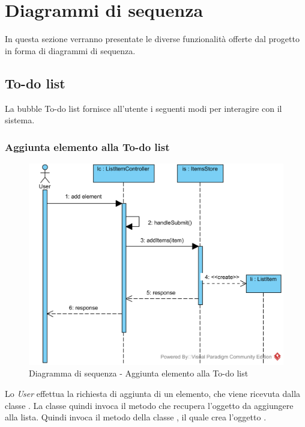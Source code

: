 \section{Diagrammi di sequenza}
In questa sezione verranno presentate le diverse funzionalità offerte dal progetto in forma di diagrammi di sequenza.

\subsection{To-do list}
La bubble To-do list fornisce all'utente i seguenti modi per interagire con il sistema.

\subsubsection{Aggiunta elemento alla To-do list}
\begin{figure}[H]
	\centering
	\includegraphics[width=15cm]{./diagrammi/sequenza/aggiunta_elemento_todo.png}
	\caption{Diagramma di sequenza - Aggiunta elemento alla To-do list}
\end{figure}
Lo \textit{User} effettua la richiesta di aggiunta di un elemento, che viene ricevuta dalla classe . La classe quindi invoca il metodo  che recupera l'oggetto da aggiungere alla lista. Quindi invoca il metodo  della classe , il quale crea l'oggetto .

